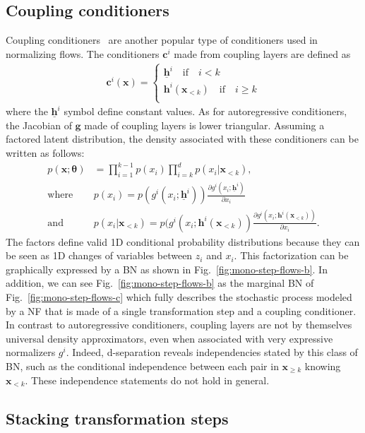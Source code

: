 \documentclass{article}
\newcommand{\mb}{\boldsymbol}
\newcommand{\figref}[1]{Fig.~\ref{#1}}
\begin{document}
\subsection{Coupling conditioners}
Coupling conditioners~\cite{RealNVP} are another popular type of conditioners used in normalizing flows. The conditioners $\mb{c}^i$ made from coupling layers are defined as
\begin{align*}
    \mb{c}^i(\mb{x}) = 
    \begin{cases} 
    \underline{\mb{h}}^i \quad \text{if} \quad i < k\\
    \mb{h}^i(\mb{x}_{<k}) \quad \text{if} \quad i \geq k\\
    \end{cases}
\end{align*}
where the $\underline{\mb{h}}^i$ symbol define constant values. As for autoregressive conditioners, the Jacobian of $\mb{g}$ made of coupling layers is lower triangular. Assuming a factored latent distribution, the density associated with these conditioners can be written as follows:
\begin{align*}
    p(\mb{x}; \mb{\theta}) &= \prod^{k-1}_{i=1} p(x_i)\prod^{d}_{i=k} p(x_i|\mb{x}_{< k}),\\
    \text{where} \quad & p(x_i) = p(g^i(x_i; \underline{\mb{h}}^i))\frac{\partial g^i(x_i; \underline{\mb{h}}^i)}{\partial x_i} \\ \text{and} \quad & p(x_i|\mb{x}_{< k}) = p(g^i(x_i; \mb{h}^i(\mb{x}_{<k})) \frac{\partial g^i(x_i; \mb{h}^i(\mb{x}_{<k}))}{\partial x_i}.
\end{align*}
The factors define valid 1D conditional probability distributions because they can be seen as 1D changes of variables between $z_i$ and $x_i$. This factorization can be graphically expressed by a BN as shown in \figref{fig:mono-step-flows-b}. In addition, we can see \figref{fig:mono-step-flows-b} as the marginal BN of \figref{fig:mono-step-flows-c} which fully describes the stochastic process modeled by a NF that is made of a single transformation step and a coupling conditioner. 
In contrast to autoregressive conditioners, coupling layers are not by themselves universal density approximators, even when associated with very expressive normalizers $g^i$. 
Indeed, d-separation reveals independencies stated by this class of BN, such as the conditional independence between each pair in $\mathbf{x}_{\geq k}$ knowing $\mathbf{x}_{< k}$. These independence statements do not hold in general.


\subsection{Stacking transformation steps} \label{sec:multiple-step-flow-as-BN}
\end{document}
